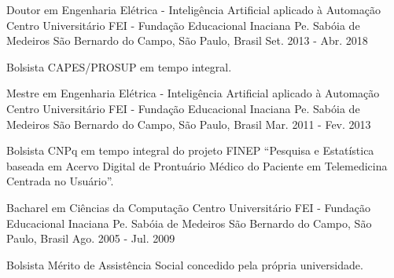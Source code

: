 

\begin{cventries}

  \cventry
    {Doutor em Engenharia Elétrica - Inteligência Artificial aplicado à Automação}
    {Centro Universitário FEI - Fundação Educacional Inaciana Pe. Sabóia de Medeiros} %
    {São Bernardo do Campo, São Paulo, Brasil} %
    {Set. 2013 - Abr. 2018}
    {
      \begin{cvitems} %
        \item {Bolsista CAPES/PROSUP em tempo integral.}
      \end{cvitems}
    }

  \cventry
    {Mestre em Engenharia Elétrica - Inteligência Artificial aplicado à Automação}
    {Centro Universitário FEI - Fundação Educacional Inaciana Pe. Sabóia de Medeiros} %
    {São Bernardo do Campo, São Paulo, Brasil} %
    {Mar. 2011 - Fev. 2013}
    {
      \begin{cvitems} %
        \item {Bolsista CNPq em tempo integral do projeto FINEP ``Pesquisa e Estatística baseada em Acervo Digital de Prontuário Médico do Paciente em Telemedicina Centrada no Usuário''.}
      \end{cvitems}
    }

  \cventry
    {Bacharel em Ciências da Computação} %
    {Centro Universitário FEI - Fundação Educacional Inaciana Pe. Sabóia de Medeiros} %
    {São Bernardo do Campo, São Paulo, Brasil} %
    {Ago. 2005 - Jul. 2009} %
    {
        \begin{cvitems} %
          \item {Bolsista Mérito de Assistência Social concedido pela própria universidade.}
        \end{cvitems}
    }

\end{cventries}

